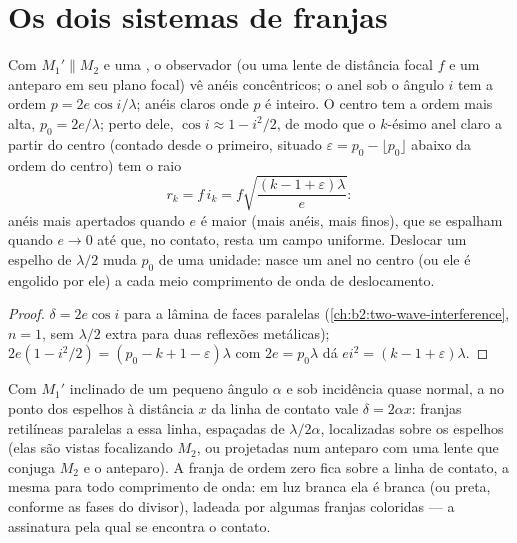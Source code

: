 \section{Os dois sistemas de franjas}

\begin{proposition}\label{prop:b2:michelson:rings}
Com $M_1' \parallel M_2$ e uma , o observador (ou uma lente
de distância focal $f$ e um anteparo em seu plano focal) vê anéis
concêntricos; o anel sob o ângulo $i$ tem a ordem $p = 2e\cos i/\lambda$; anéis
claros onde $p$ é inteiro. O centro tem a ordem mais alta, $p_0 =
2e/\lambda$; perto dele, $\cos i \approx 1 - i^2/2$, de modo que o $k$-ésimo anel claro a partir do
centro (contado desde o primeiro, situado $\varepsilon = p_0 - \lfloor p_0\rfloor$
abaixo da ordem do centro) tem o raio
\[
r_k = f\,i_k = f\sqrt{\frac{(k - 1 + \varepsilon)\lambda}e} :
\]
anéis mais apertados quando $e$ é maior (mais anéis, mais finos), que se espalham quando $e \to 0$
até que, no contato, resta um campo uniforme. Deslocar um espelho de $\lambda/2$ muda
$p_0$ de uma unidade: nasce um anel no centro (ou ele é engolido por ele) a cada
meio comprimento de onda de deslocamento.
\end{proposition}

\begin{proof}
$\delta = 2e\cos i$ para a lâmina de faces paralelas (\cref{ch:b2:two-wave-interference},
$n = 1$, sem $\lambda/2$ extra para duas reflexões metálicas); $2e(1 - i^2/2) =
(p_0 - k + 1 - \varepsilon)\lambda$ com $2e = p_0\lambda$ dá $ei^2 = (k - 1 + \varepsilon)\lambda$.
\end{proof}

\begin{proposition}\label{prop:b2:michelson:wedge}
Com $M_1'$ inclinado de um pequeno ângulo $\alpha$ e sob incidência quase normal, a
 no ponto dos espelhos à distância $x$ da
linha de contato vale $\delta = 2\alpha x$: franjas retilíneas paralelas a essa linha,
espaçadas de $\lambda/2\alpha$, localizadas sobre os espelhos (elas são vistas focalizando
$M_2$, ou projetadas num anteparo com uma lente que conjuga $M_2$ e o
anteparo). A franja de ordem zero fica sobre a linha de contato, a mesma para
todo comprimento de onda: em luz branca ela é branca (ou preta, conforme
as fases do divisor), ladeada por algumas franjas coloridas --- a
assinatura pela qual se encontra o contato.
\end{proposition}

